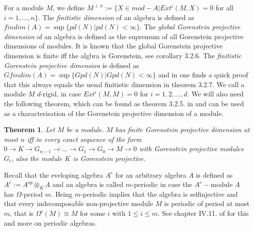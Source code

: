 \documentclass[a4paper]{amsart}
\newtheorem{theorem}{Theorem}[section]
\theoremstyle{definition}
\theoremstyle{remark}
\numberwithin{equation}{theorem}
\begin{document}
For a module $M$, we define $M^{\perp n}:= \{ X \in mod-A | Ext^{i}(M,X)=0$ for all $i=1,...,n \}$.
The \emph{finitistic dimension} of an algebra is defined as $findim(A)= \sup \{ pd(N) | pd(N) < \infty \}$.
The \emph{global Gorenstein projective dimension} of an algebra is defined as the supremum of all Gorenstein projective dimensions of modules. It is known that the global Gorenstein projective dimension is finite iff the algbra is Gorenstein, see \cite{Che} corollary 3.2.6. The \emph{finitistic Gorenstein projective dimension} is defined as $Gfindim(A)= \sup \{ Gpd(N) | Gpd(N) < \infty \}$ and in \cite{Che} one finds a quick proof that this always equals the usual finitistic dimension in theorem 3.2.7. We call a module $M$ $d$-rigid, in case $Ext^{i}(M,M)=0$ for $i=1,2,...,d$.
We will also need the following theorem, which can be found as theorem 3.2.5. in \cite{Che} and can be used as a characterisation of the Gorenstein projective dimension of a module.
\begin{theorem} \label{gordimchara}
Let $M$ be a module. $M$ has finite Gorenstein projective dimension at most $n$ iff in every exact sequence of the form $0 \rightarrow K \rightarrow G_{n-1} \rightarrow ... \rightarrow G_1 \rightarrow G_0 \rightarrow M \rightarrow 0$ with Gorenstein projective modules $G_i$, also the module $K$ is Gorenstein projective.

\end{theorem}

Recall that the eveloping algebra $A^{e}$ for an arbitrary algebra $A$ is defined as $A^{e}:=A^{op} \otimes_K A$ and an algebra is called $m$-periodic in case the $A^{e}-$module $A$ has $\Omega$-period $m$. Being $m$-periodic implies that the algebra is selfinjective and that every indecomposable non-projective module $M$ is periodic of period at most $m$, that is $\Omega^i(M) \cong M$ for some $i$ with $1 \leq i \leq m$. See chapter IV.11. of \cite{SkoYam} for this and more on periodic algebras.
\end{document}
